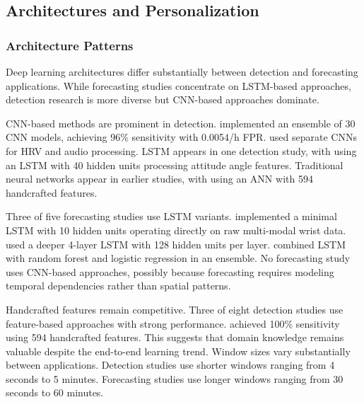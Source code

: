\subsection{Architectures and Personalization}
\label{sec:modalities-architectures}

\subsubsection{Architecture Patterns}

Deep learning architectures differ substantially between detection and forecasting applications. While forecasting studies concentrate on LSTM-based approaches, detection research is more diverse but CNN-based approaches dominate.

CNN-based methods are prominent in detection. \textcite{spahrDeepLearningbasedDetection2025} implemented an ensemble of 30 CNN models, achieving 96\% sensitivity with 0.0054/h FPR. \textcite{elemamAutomatedValidatedTool2025} used separate CNNs for HRV and audio processing. LSTM appears in one detection study, with \textcite{wangEpilepticSeizureDetection2025} using an LSTM with 40 hidden units processing attitude angle features. Traditional neural networks appear in earlier studies, with \textcite{fineDetectionKeyAutomated2025} using an ANN with 594 handcrafted features.

Three of five forecasting studies use LSTM variants. \textcite{meiselMachineLearningWristband2020} implemented a minimal LSTM with 10 hidden units operating directly on raw multi-modal wrist data. \textcite{nasseriAmbulatorySeizureForecasting2021} used a deeper 4-layer LSTM with 128 hidden units per layer. \textcite{stirlingForecastingSeizureLikelihood2021} combined LSTM with random forest and logistic regression in an ensemble. No forecasting study uses CNN-based approaches, possibly because forecasting requires modeling temporal dependencies rather than spatial patterns.

Handcrafted features remain competitive. Three of eight detection studies use feature-based approaches with strong performance. \textcite{fineDetectionKeyAutomated2025} achieved 100\% sensitivity using 594 handcrafted features. This suggests that domain knowledge remains valuable despite the end-to-end learning trend. Window sizes vary substantially between applications. Detection studies use shorter windows ranging from 4 seconds to 5 minutes. Forecasting studies use longer windows ranging from 30 seconds to 60 minutes.

